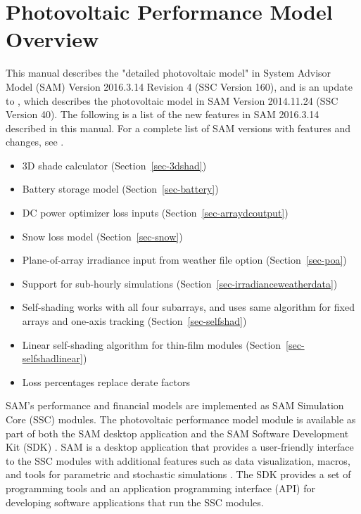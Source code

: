 \documentclass[12pt,letterpaper]{article}
\begin{document}
\chapter{Photovoltaic Performance Model Overview}

This manual describes the "detailed photovoltaic model" in System Advisor Model (SAM) Version 2016.3.14 Revision 4 (SSC Version 160), and is an update to \citet{gilman2015}, which describes the photovoltaic model in SAM Version 2014.11.24 (SSC Version 40). The following is a list of the new features in SAM 2016.3.14 described in this manual. For a complete list of SAM versions with features and changes, see \citet{releasenotes}.

\begin{itemize}
\item 3D shade calculator (Section~\ref{sec-3dshad})
\item Battery storage model (Section~\ref{sec-battery})
\item DC power optimizer loss inputs (Section~\ref{sec-arraydcoutput})
\item Snow loss model (Section~\ref{sec-snow})
\item Plane-of-array irradiance input from weather file option (Section~\ref{sec-poa})
\item Support for sub-hourly simulations (Section~\ref{sec-irradianceweatherdata})
\item Self-shading works with all four subarrays, and uses same algorithm for fixed arrays and one-axis tracking (Section~\ref{sec-selfshad})
\item Linear self-shading algorithm for thin-film modules (Section~\ref{sec-selfshadlinear})
\item Loss percentages replace derate factors
\end{itemize}

SAM's performance and financial models are implemented as SAM Simulation Core (SSC) modules. The photovoltaic performance model module is available as part of both the SAM desktop application \citep{download} and the SAM Software Development Kit (SDK) \citep{sdk}. SAM is a desktop application that provides a user-friendly interface to the SSC modules with additional features such as data visualization, macros, and tools for parametric and stochastic simulations \citep{blair2014}. The SDK provides a set of programming tools and an application programming interface (API) for developing software applications that run the SSC modules.
\end{document}
